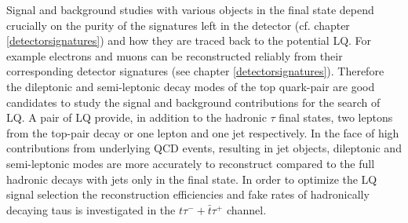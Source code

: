 Signal and background studies with various objects in the final state depend crucially on the purity of the signatures left in the detector (cf. chapter \ref{detectorsignatures}) and how they are traced back to the potential LQ. For example electrons and muons can be reconstructed reliably from their corresponding detector signatures (see chapter \ref{detectorsignatures}). Therefore the dileptonic and semi-leptonic decay modes of the top quark-pair are good candidates to study the signal and background contributions for the search of LQ. A pair of LQ provide, in addition to the hadronic $\tau$ final states, two leptons from the top-pair decay or one lepton and one jet respectively. In the face of high contributions from underlying QCD events, resulting in jet objects, dileptonic and semi-leptonic modes are more accurately to reconstruct compared to the full hadronic decays with jets only in the final state. In order to optimize the LQ signal selection the reconstruction efficiencies and fake rates of hadronically decaying taus is investigated in the $t\tau^{-}+\bar{t}\tau^{+}$ channel.
%
